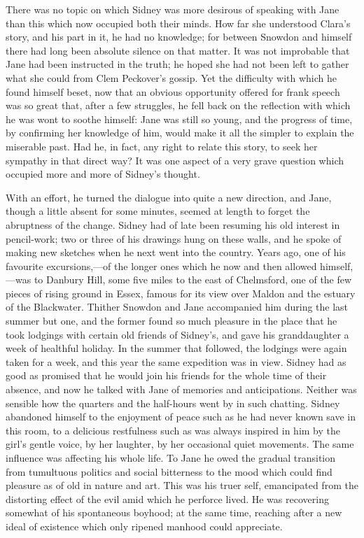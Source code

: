 There was no topic on which Sidney was more desirous of speaking with
Jane than this which now occupied both their minds. How far she
understood Clara's story, and his {}part in it, he had no knowledge; for
between Snowdon and himself there had long been absolute silence on that
matter. It was not improbable that Jane had been instructed in the
truth; he hoped she had not been left to gather what she could from Clem
Peckover's gossip. Yet the difficulty with which he found himself beset,
now that an obvious opportunity offered for frank speech was so great
that, after a few struggles, he fell back on the reflection with which
he was wont to soothe himself: Jane was still so young, and the progress
of time, by confirming her knowledge of him, would make it all the
simpler to explain the miserable past. Had he, in fact, any right to
relate this story, to seek her sympathy in that direct way? It was one
aspect of a very grave question which occupied more and more of Sidney's
thought.

With an effort, he turned the dialogue into quite a new direction, and
Jane, though a little absent for some minutes, seemed at length to
forget the abruptness of the change. Sidney had of late been resuming
his old {}interest in pencil-work; two or three of his drawings hung on
these walls, and he spoke of making new sketches when he next went into
the country. Years ago, one of his favourite excursions,---of the longer
ones which he now and then allowed himself,---was to Danbury Hill, some
five miles to the east of Chelmsford, one of the few pieces of rising
ground in Essex, famous for its view over Maldon and the estuary of the
Blackwater. Thither Snowdon and Jane accompanied him during the last
summer but one, and the former found so much pleasure in the place that
he took lodgings with certain old friends of Sidney's, and gave his
granddaughter a week of healthful holiday. In the summer that followed,
the lodgings were again taken for a week, and this year the same
expedition was in view. Sidney had as good as promised that he would
join his friends for the whole time of their absence, and now he talked
with Jane of memories and anticipations. Neither was sensible how the
quarters and the half-hours went by in such chatting. Sidney {}abandoned
himself to the enjoyment of peace such as he had never known save in
this room, to a delicious restfulness such as was always inspired in him
by the girl's gentle voice, by her laughter, by her occasional quiet
movements. The same influence was affecting his whole life. To Jane he
owed the gradual transition from tumultuous politics and social
bitterness to the mood which could find pleasure as of old in nature and
art. This was his truer self, emancipated from the distorting effect of
the evil amid which he perforce lived. He was recovering somewhat of his
spontaneous boyhood; at the same time, reaching after a new ideal of
existence which only ripened manhood could appreciate.

